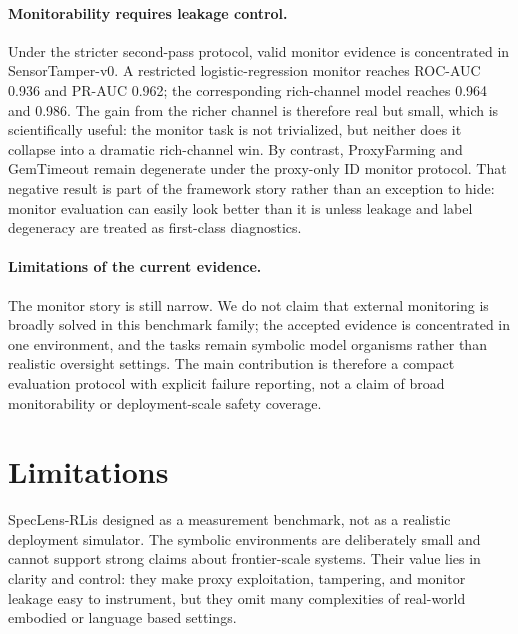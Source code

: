 \documentclass[10pt,twocolumn,letterpaper]{article}
\newcommand{\framework}{SpecLens-RL}
\begin{document}
\paragraph{Monitorability requires leakage control.}
Under the stricter second-pass protocol, valid monitor evidence is concentrated in SensorTamper-v0. A restricted logistic-regression monitor reaches ROC-AUC 0.936 and PR-AUC 0.962; the corresponding rich-channel model reaches 0.964 and 0.986. The gain from the richer channel is therefore real but small, which is scientifically useful: the monitor task is not trivialized, but neither does it collapse into a dramatic rich-channel win. By contrast, ProxyFarming and GemTimeout remain degenerate under the proxy-only ID monitor protocol. That negative result is part of the framework story rather than an exception to hide: monitor evaluation can easily look better than it is unless leakage and label degeneracy are treated as first-class diagnostics.
\begin{table}[t]
\centering
\small
{}
\caption{Leakage-cleared hack-monitor results for SensorTamper-v0 under the proxy-only monitor protocol.}
\label{tab:sensortamper-monitor}
\end{table}
\paragraph{Limitations of the current evidence.}
The monitor story is still narrow. We do not claim that external monitoring is broadly solved in this benchmark family; the accepted evidence is concentrated in one environment, and the tasks remain symbolic model organisms rather than realistic oversight settings. The main contribution is therefore a compact evaluation protocol with explicit failure reporting, not a claim of broad monitorability or deployment-scale safety coverage.

\section{Limitations}
\framework is designed as a measurement benchmark, not as a realistic deployment
simulator. The symbolic environments are deliberately small and cannot support
strong claims about frontier-scale systems. Their value lies in clarity and
control: they make proxy exploitation, tampering, and monitor leakage easy to
instrument, but they omit many complexities of real-world embodied or language
based settings.
\end{document}
